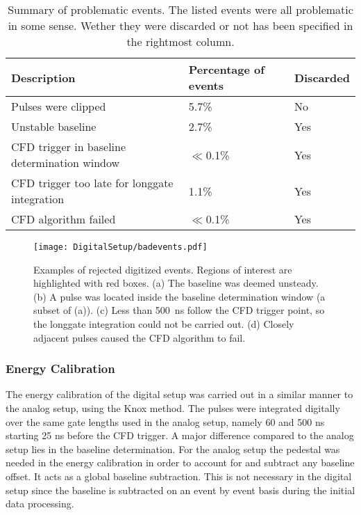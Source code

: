 \documentclass[main.tex]{subfiles}
\begin{document}
\begin{table}[]
\begin{tabular}{|l|l|l|}
\hline
Description                          & Percentage of events & Discarded \\ \hline
Pulses were clipped                           & 5.7\%                          & No                 \\ \hline
Unstable baseline                             & 2.7\%                        & Yes                \\ \hline
CFD trigger in baseline determination window  & $\ll$0.1\%                      & Yes                \\ \hline
CFD trigger too late for longgate integration & 1.1\%                         & Yes                \\ \hline
CFD algorithm failed                          & $\ll$0.1\%                    & Yes                \\ \hline

\end{tabular}
\caption[Summary of problematic events.]{Summary of problematic events. The listed events were all problematic in some sense. Wether they were discarded or not has been specified in the rightmost column.}
\label{tab:badevents}
\end{table}

\begin{figure}[ht!]
    \centering
        \texttt{[image: DigitalSetup/badevents.pdf]}
        \caption[Examples of rejected digitized events]{Examples of rejected digitized events. Regions of interest are highlighted with red boxes. (a) The baseline was deemed unsteady. (b) A pulse was located inside the baseline determination window (a subset of (a)). (c) Less than \SI{500}{ns} follow the CFD trigger point, so the longgate integration could not be carried out. (d) Closely adjacent pulses caused the CFD algorithm to fail.}
    \label{fig:badevents} 
\end{figure}
\newpage
\subsubsection{Energy Calibration}\label{sec:Ecal_D}
The energy calibration of the digital setup was carried out in a similar manner to the analog setup, using the Knox method. The pulses were integrated digitally over the same gate lengths used in the analog setup, namely 60 and 500 ns starting 25 ns before the CFD trigger. A major difference compared to the analog setup lies in the baseline determination. For the analog setup the pedestal was needed in the energy calibration in order to account for and subtract any baseline offset. It acts as a global baseline subtraction. This is not necessary in the digital setup since the baseline is subtracted on an event by event basis during the initial data processing. 
\end{document}
